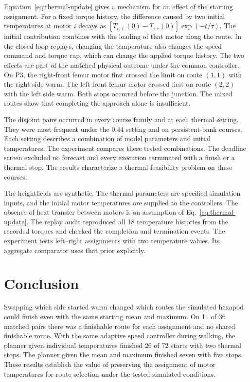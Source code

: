 \documentclass{ieeeaccess}
\begin{document}
Equation~\eqref{eq:thermal-update} gives a mechanism for an effect of the starting assignment. For a fixed torque history, the difference caused by two initial temperatures at motor $i$ decays as $[T_{i,\ell}(0)-T_{i,r}(0)]\exp(-t/\tau)$. The initial contribution combines with the loading of that motor along the route. In the closed-loop replays, changing the temperature also changes the speed command and torque cap, which can change the applied torque history. The two effects are part of the matched physical outcome under the common controller. On P3, the right-front femur motor first crossed the limit on route $(1,1)$ with the right side warm. The left-front femur motor crossed first on route $(2,2)$ with the left side warm. Both stops occurred before the junction. The mixed routes show that completing the approach alone is insufficient.

The disjoint pairs occurred in every course family and at each thermal setting. They were most frequent under the 0.44 setting and on persistent-bank courses. Each setting describes a combination of model parameters and initial temperatures. The experiment compares these tested combinations. The deadline screen excluded no forecast and every execution terminated with a finish or a thermal stop. The results characterize a thermal feasibility problem on these courses.

The heightfields are synthetic. The thermal parameters are specified simulation inputs, and the initial motor temperatures are supplied to the controllers. The absence of heat transfer between motors is an assumption of Eq.~\eqref{eq:thermal-update}. The replay audit reproduced all 18 temperature histories from the recorded torques and checked the completion and termination events. The experiment tests left--right assignments with two temperature values. Its aggregate comparator uses that prior explicitly.

\section{Conclusion}

Swapping which side started warm changed which routes the simulated hexapod could finish even with the same starting mean and maximum. On 11 of 36 matched pairs there was a finishable route for each assignment and no shared finishable route. With the same adaptive speed controller during walking, the planner given individual temperatures finished 26 of 72 starts with two thermal stops. The planner given the mean and maximum finished seven with five stops. These results establish the value of preserving the assignment of motor temperatures for route selection under the tested simulated conditions.
\end{document}
